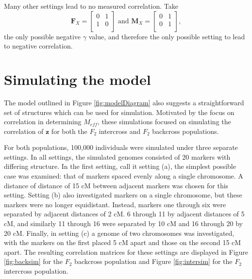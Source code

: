 \documentclass{article}
\newcommand{\ve}[1]{\mathbf{#1}}           %
\newcommand{\m}[1]{\mathbf{#1}}               %
\begin{document}
Many other settings lead to no measured correlation. Take
$$\m{F}_X = \begin{bmatrix}
  0 & 1 \\
  1 & 0 \\
\end{bmatrix} \text{ and } \m{M}_X = \begin{bmatrix}
  0 & 1 \\
  0 & 1 \\
\end{bmatrix},$$
the only possible negative $\gamma$ value, and therefore the only possible setting to lead to negative correlation.

\section{Simulating the model} \label{subsec:sim}

The model outlined in Figure \ref{fig:modelDiagram} also suggests a straightforward set of structures which can be used for simulation. Motivated by the focus on correlation in determining $M_{eff}$, these simulations focused on simulating the correlation of $\ve{z}$ for both the $F_2$ intercross and $F_2$ backcross populations.

For both populations, 100,000 individuals were simulated under three separate settings. In all settings, the simulated genomes consisted of 20 markers with differing structure. In the first setting, call it setting (a), the simplest possible case was examined: that of markers spaced evenly along a single chromosome. A distance of distance of 15 cM between adjacent markers was chosen for this setting. Setting (b) also investigated markers on a single chromosome, but these markers were no longer equidistant. Instead, markers one through six were separated by adjacent distances of 2 cM. 6 through 11 by adjacent distances of 5 cM, and similarly 11 through 16 were separated by 10 cM and 16 through 20 by 20 cM. Finally, in setting (c) a genome of two chromosomes was investigated, with the markers on the first placed 5 cM apart and those on the second 15 cM apart. The resulting correlation matrices for these settings are displayed in Figure \ref{fig:backsim} for the $F_2$ backcross population and Figure \ref{fig:intersim} for the $F_2$ intercross population.
\end{document}
